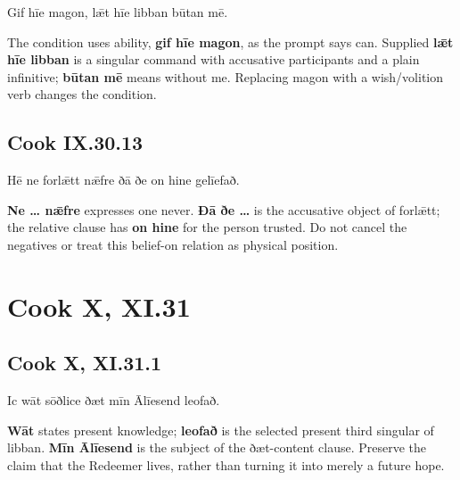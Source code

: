 \par\begin{minipage}{\linewidth}\raggedright
Gif hīe magon, lǣt hīe libban būtan mē.

The condition uses ability, \textbf{gif hīe magon}, as the prompt says can. Supplied \textbf{lǣt hīe libban} is a singular command with accusative participants and a plain infinitive; \textbf{būtan mē} means without me. Replacing magon with a wish/\allowbreak{}volition verb changes the condition.

\end{minipage}\par\addvspace{4pt}

\subsection*{Cook IX.30.13}

\par\begin{minipage}{\linewidth}\raggedright
Hē ne forlǣtt nǣfre ðā ðe on hine gelīefað.

\textbf{Ne … nǣfre} expresses one never. \textbf{Ðā ðe …} is the accusative object of forlǣtt; the relative clause has \textbf{on hine} for the person trusted. Do not cancel the negatives or treat this belief-on relation as physical position.

\end{minipage}\par\addvspace{4pt}

\section*{Cook X, XI.31}

\subsection*{Cook X, XI.31.1}

\par\begin{minipage}{\linewidth}\raggedright
Ic wāt sōðlice ðæt mīn Ālīesend leofað.

\textbf{Wāt} states present knowledge; \textbf{leofað} is the selected present third singular of libban. \textbf{Mīn Ālīesend} is the subject of the ðæt-content clause. Preserve the claim that the Redeemer lives, rather than turning it into merely a future hope.

\end{minipage}\par\addvspace{4pt}

